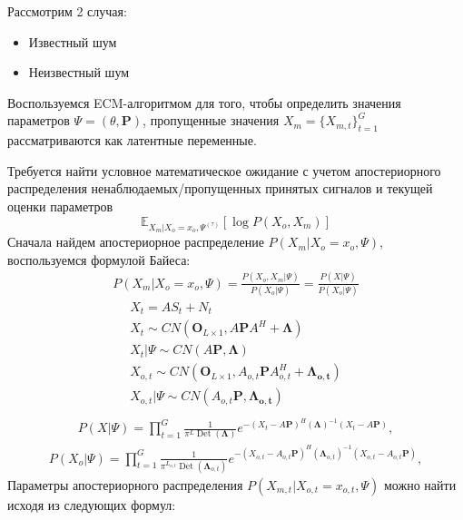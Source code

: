 \documentclass[11pt]{article}
\newcommand{\Expect}{\mathbb{E}}
\DeclareMathOperator{\Det}{Det}
\begin{document}
Рассмотрим 2 случая:
\begin{itemize}
\item
Известный шум
\item
Неизвестный шум
\end{itemize}
\begin{center}
\fontsize{16}{20}\selectfont {}
\end{center}
Воспользуемся ECM-алгоритмом для того, чтобы определить значения параметров $\Psi = (\theta, \mathbf{P})$, пропущенные значения $X_m=\{X_{m,t}\}_{t=1}^G$ рассматриваются как латентные переменные.
\begin{center}
\fontsize{14}{18}\selectfont {}
\end{center}
Требуется найти условное математическое ожидание с учетом апостериорного распределения ненаблюдаемых/пропущенных принятых сигналов и текущей оценки параметров
\begin{equation}
 \Expect_{X_m|X_o=x_o, \Psi^{(\tau)}}[\log P(X_o, X_m)]
\end{equation}
Сначала найдем апостериорное распределение $P(X_m|X_o=x_o,\Psi)$, воспользуемся формулой Байеса:
\begin{gather}
P(X_m|X_o=x_o,\Psi) = \frac{P(X_o, X_m|\Psi)}{P(X_o|\Psi)} = \frac{P(X|\Psi)}{P(X_o|\Psi)}
\end{gather}
\begin{gather*}
X_t = AS_t + N_t \\
X_t \sim CN(\mathbf{O}_{L \times 1}, A\mathbf{P}A^H + \mathbf{\Lambda})\\
X_t | \Psi \sim CN(A\mathbf{P}, \mathbf{\Lambda})\\
X_{o,t} \sim CN(\mathbf{O}_{L \times 1}, A_{o,t}\mathbf{P}A_{o,t}^H + \mathbf{\Lambda_{o,t}})\\
X_{o,t} | \Psi \sim CN(A_{o,t}\mathbf{P}, \mathbf{\Lambda_{o,t}})\\
\end{gather*}
\begin{gather}
P(X|\Psi) = \prod_{t=1}^G \frac{1}{\pi^L \Det(\mathbf{\Lambda})}e^{-(X_t-A\mathbf{P})^H (\mathbf{\Lambda})^{-1}(X_t-A\mathbf{P})},
\end{gather}
\begin{gather}
P(X_o|\Psi) = \prod_{t=1}^G \frac{1}{\pi^{L_{o,t}} \Det(\mathbf{\Lambda}_{o,t})}e^{-(X_{o,t}-A_{o,t}\mathbf{P})^H (\mathbf{\Lambda}_{o,t})^{-1}(X_{o,t}-A_{o,t}\mathbf{P})},
\end{gather}
Параметры апостериорного распределения $P(X_{m,t}|X_{o,t}=x_{o,t},\Psi)$ можно найти исходя из следующих формул:
\end{document}
